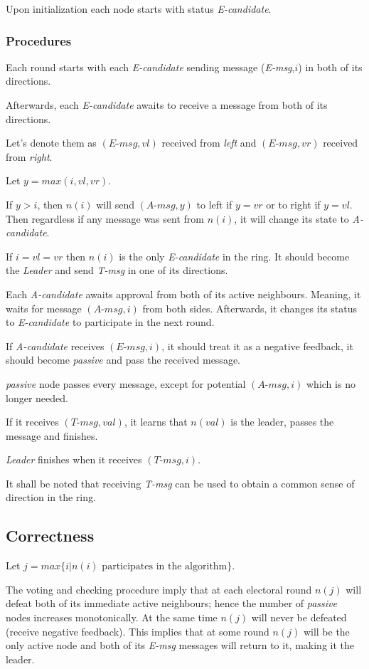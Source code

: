 \documentclass{article}
\begin{document}
Upon initialization each node starts with status \textit{E-candidate}.
\subsubsection*{Procedures}
Each round starts with each \textit{E-candidate} sending message (\textit{E-msg},$i$) in both of its directions.

Afterwards, each \textit{E-candidate} awaits to receive a message from both of its directions.

Let's denote them as $(\textit{E-msg},vl)$ received from \textit{left} and $(\textit{E-msg},vr)$ received from \textit{right}.

Let $y=max(i,vl,vr)$.

If $y>i$, then $n(i)$ will send $(\textit{A-msg},y)$ to left if $y=vr$ or to right if $y=vl$.
Then regardless if any message was sent from $n(i)$, it will change its state to \textit{A-candidate}.

If $i=vl=vr$ then $n(i)$ is the only \textit{E-candidate} in the ring. It should become the \textit{Leader} and send \textit{T-msg} in one of its directions.

Each \textit{A-candidate} awaits approval from both of its active neighbours. Meaning, it waits for message $(\textit{A-msg},i)$ from both sides. Afterwards, it changes its status to \textit{E-candidate} to participate in the next round.

If \textit{A-candidate} receives $(\textit{E-msg},i)$, it should treat it as a negative feedback, it should become \textit{passive} and pass the received message.

\textit{passive} node passes every message, except for potential $(\textit{A-msg},i)$ which is no longer needed.

If it receives $(\textit{T-msg},val)$, it learns that $n(val)$ is the leader, passes the message and finishes.

\textit{Leader} finishes when it receives $(\textit{T-msg},i)$.

It shall be noted that receiving \textit{T-msg} can be used to obtain a common sense of direction in the ring.
\subsection*{Correctness}
Let $j=max\{i | n(i) \text{ participates in the algorithm}\}$. 

The voting and checking procedure imply that at each electoral round $n(j)$ will defeat both of its immediate active neighbours; hence the number of \textit{passive} nodes increases monotonically. At the same time $n(j)$ will never be defeated (receive negative feedback). This implies that at some round $n(j)$ will be the only active node and both of its \textit{E-msg} messages will return to it, making it the leader.
\end{document}
